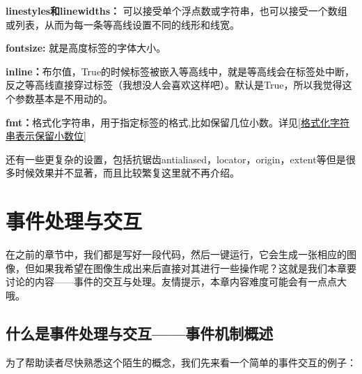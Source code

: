 \documentclass[12pt]{article}
\begin{document}
\noindent\textbf{linestyles和linewidths： }可以接受单个浮点数或字符串，也可以接受一个数组或列表，从而为每一条等高线设置不同的线形和线宽。

\noindent\textbf{fontsize: }就是高度标签的字体大小。

\noindent\textbf{inline：}布尔值，True的时候标签被嵌入等高线中，就是等高线会在标签处中断，反之等高线直接穿过标签（我想没人会喜欢这样吧）。默认是True，所以我觉得这个参数基本是不用动的。

\noindent\textbf{fmt：}格式化字符串，用于指定标签的格式,比如保留几位小数。详见\ref{格式化字符串表示保留小数位}

还有一些更复杂的设置，包括抗锯齿antialiased，locator，origin，extent等但是很多时候效果并不显著，而且比较繁复这里就不再介绍。
\newpage
\section{事件处理与交互}
在之前的章节中，我们都是写好一段代码，然后一键运行，它会生成一张相应的图像，但如果我希望在图像生成出来后直接对其进行一些操作呢？这就是我们本章要讨论的内容——事件的交互与处理。友情提示，本章内容难度可能会有一点点大哦。
\subsection{什么是事件处理与交互——事件机制概述}
为了帮助读者尽快熟悉这个陌生的概念，我们先来看一个简单的事件交互的例子：
\end{document}
